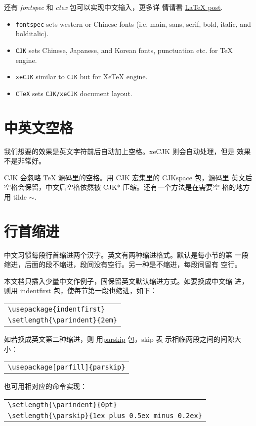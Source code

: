 还有 \textit{fontspec} 和 \textit{ctex} 包可以实现中文输入，更多详
情请看 \href{https://www.zhstar.win/2015/02/05/LaTeX/}{\LaTeX{}
  post}.

\begin{itemize}
\item \verb|fontspec| sets western or Chinese fonts (i.e. main, sans, serif, bold, italic, and bolditalic).
\item \verb|CJK| sets Chinese, Japanese, and Korean fonts, punctuation etc. for TeX engine.
\item \verb|xeCJK| similar to \verb|CJK| but for XeTeX engine.
\item \verb|CTeX| sets \verb|CJK/xeCJK| document layout.
\end{itemize}

\section{中英文空格}
我们想要的效果是英文字符前后自动加上空格。xeCJK 则会自动处理，但是
效果不是非常好。

CJK 会忽略 \TeX{} 源码里的空格。用 CJK 宏集里的 CJKspace 包，源码里
英文后空格会保留，中文后空格依然被 CJK* 压缩。还有一个方法是在需要空
格的地方用 tilde $\sim$.

\section{行首缩进}

中文习惯每段行首缩进两个汉字。英文有两种缩进格式。默认是每小节的第
一段缩进，后面的段不缩进，段间没有空行。另一种是不缩进，每段间留有
空行。

本文档只插入少量中文作例子，固保留英文默认缩进方式。如要换成中文缩
进，则用 indentfirst 包，使每节第一段也缩进，如下：
\begin{center}
  \begin{tabular}{l}
    \verb|\usepackage{indentfirst}| \\
    \verb|\setlength{\parindent}{2em}|
  \end{tabular}
\end{center}
如若换成英文第二种缩进，则
用\href{https://tex.stackexchange.com/a/40432}{parskip} 包，skip 表
示相临两段之间的间隙大小：
\begin{center}
  \begin{tabular}{l}
    \verb|\usepackage[parfill]{parskip}|
  \end{tabular}
\end{center}
也可用相对应的命令实现：
\begin{center}
  \begin{tabular}{l}
    \verb|\setlength{\parindent}{0pt}| \\
    \verb|\setlength{\parskip}{1ex plus 0.5ex minus 0.2ex}|
  \end{tabular}
\end{center}

